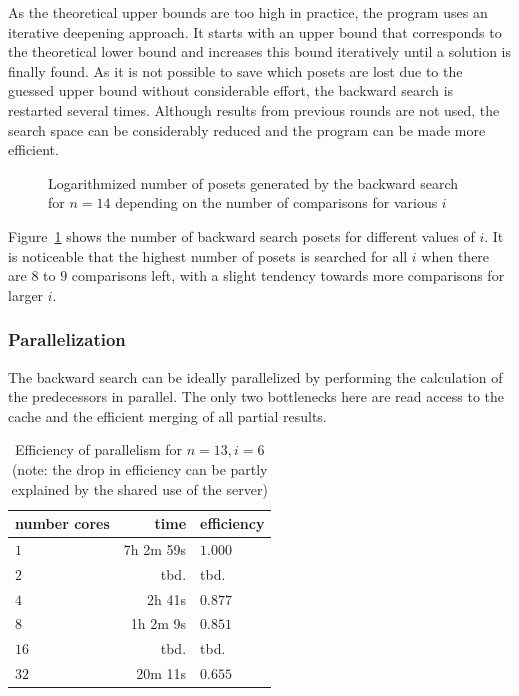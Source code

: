 \documentclass[10pt,journal,compsoc]{IEEEtran}
\begin{document}
As the theoretical upper bounds are too high in practice, the program uses an iterative deepening approach.
It starts with an upper bound that corresponds to the theoretical lower bound and increases this bound iteratively until a solution is finally found.
As it is not possible to save which posets are lost due to the guessed upper bound without considerable effort, the backward search is restarted several times.
Although results from previous rounds are not used, the search space can be considerably reduced and the program can be made more efficient.

\begin{figure}
  \centering
  
  \caption{Logarithmized number of posets generated by the backward search for $n = 14$ depending on the number of comparisons for various $i$}
  \label{fig:backward-posets-per-level}
\end{figure}

Figure~\ref{fig:backward-posets-per-level} shows the number of backward search posets for different values of $i$.
It is noticeable that the highest number of posets is searched for all $i$ when there are $8$ to $9$ comparisons left, with a slight tendency towards more comparisons for larger $i$.


\subsubsection{Parallelization} \label{sec:backward:parallelisation}

The backward search can be ideally parallelized by performing the calculation of the predecessors in parallel.
The only two bottlenecks here are read access to the cache and the efficient merging of all partial results.

\begin{table}
  \begin{tabular}{l|r|l}
    number cores & time      & efficiency \\
    \hline
    $1$          & 7h 2m 59s & $1.000$    \\
    $2$          & tbd.      & tbd.       \\  %
    $4$          & 2h 41s    & $0.877$    \\
    $8$          & 1h 2m 9s  & $0.851$    \\
    $16$         & tbd.      & tbd.       \\ %
    $32$         & 20m 11s   & $0.655$    \\ %
  \end{tabular}
  \centering
  \caption{Efficiency of parallelism for $n = 13, i = 6$ (note: the drop in efficiency can be partly explained by the shared use of the server)}
  \label{table:backward-parallel}
\end{table}
\end{document}
